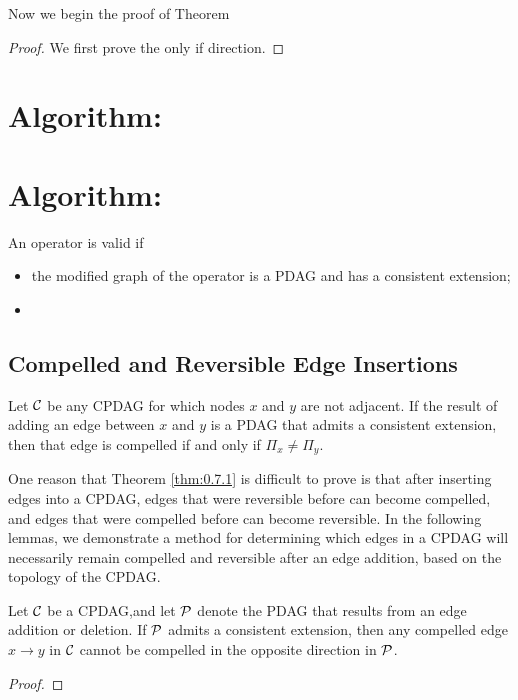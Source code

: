 Now we begin the proof of Theorem 
\begin{proof}
    We first prove the only if direction.
\end{proof}



\section{Algorithm: }


\section{Algorithm: }

\begin{definition}
    An operator is valid if
    \begin{itemize}
        \item the modified graph of the operator is a PDAG and has a consistent extension;
        \item 
    \end{itemize}
\end{definition}

\subsection{Compelled and Reversible Edge Insertions}
\begin{theorem}\label{thm:0.7.1}
    Let $\mathcal{C}$ be any CPDAG for which nodes $x$ and $y$ are not adjacent. If the result of adding an edge between $x$ and $y$ is a PDAG that admits a consistent extension, then that edge is compelled if and only if $\Pi_x \neq \Pi_y$.
\end{theorem}
One reason that Theorem \ref*{thm:0.7.1} is difficult to prove is that after inserting edges into a CPDAG, edges that were reversible before can become compelled, and edges that were compelled before can become reversible.
In the following lemmas, we demonstrate a method for determining which edges in a CPDAG will necessarily remain compelled and reversible after an edge addition, based on the topology of the CPDAG.

\begin{lemma}
    Let $\mathcal{C}$ be a CPDAG,and let $\mathcal{P}$ denote the PDAG that results from an edge addition or deletion. If $\mathcal{P}$ admits a consistent extension, then any compelled edge $x \rightarrow y$ in $\mathcal{C}$ cannot be compelled in the opposite direction in $\mathcal{P}$.
\end{lemma}
\begin{proof}
    
\end{proof}

